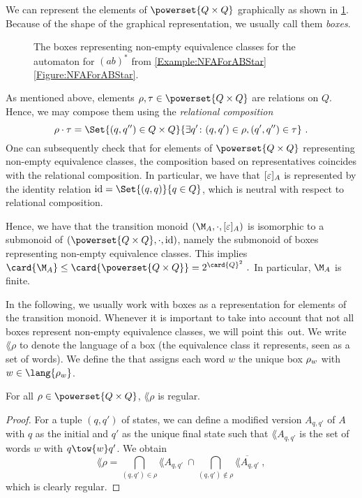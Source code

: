 \documentclass[../../diss.tex]{subfiles}
\begin{document}
We can represent the elements of $\powerset{Q \times Q}$ graphically as shown in \cref{Figure:BoxesForABStar}.
Because of the shape of the graphical representation, we usually call them \emph{boxes}.

\begin{figure}
    \centering
    
    \caption{The boxes representing non-empty equivalence classes for the automaton for ${(ab)}^*$ from \cref{Example:NFAForABStar} \resp \cref{Figure:NFAForABStar}.}%
    \label{Figure:BoxesForABStar}%
\end{figure}


As mentioned above, elements $\rho, \tau \in \powerset{Q \times Q}$ are relations on $Q$.
Hence, we may compose them using the \emph{relational composition}
\[
    \rho \relcomp \tau = \Set{ (q,q'') \in Q \times Q}{ \exists q' \colon (q,q') \in \rho, (q',q'') \in \tau}
    \ .
\]
One can subsequently check that for elements of $\powerset{Q \times Q}$ representing non-empty equivalence classes, the composition based on representatives coincides with the relational composition.
In particular, we have that $[\varepsilon]_{A}$ is represented by the identity relation $\id = \Set{ (q,q) }{ q \in Q}$, which is neutral with respect to relational composition.

Hence, we have that the transition monoid $(\nfatransmonoid{A},\relcomp,\nfaequivclass{A}{\varepsilon})$ is isomorphic to a submonoid of $(\powerset{Q \times Q}, \relcomp, \id)$, namely the submonoid of boxes representing non-empty equivalence classes.
This implies
\(
    \card{\nfatransmonoid{A}} \leq \card{\powerset{Q \times Q}} = 2^{\card{Q}^2}
    \ .
\)
In particular, $\nfatransmonoid{A}$ is finite.


In the following, we usually work with boxes as a representation for elements of the transition monoid.
Whenever it is important to take into account that not all boxes represent non-empty equivalence classes, we will point this~out.
We write $\lang{\rho}$ to denote the language of a box (\ie the equivalence class it represents, seen as a set of words).
We define the  that assigns each word $w$ the unique box $\tbox{w}$ with $w \in \lang{\tbox{w}}$.

\begin{lemma}
    For all $\rho \in \powerset{Q \times Q}$, $\lang{\rho}$ is regular.
\end{lemma}

\begin{proof}
    For a tuple $(q,q')$ of states, we can define a modified version $A_{q,q'}$ of $A$ with $q$ as the initial and $q'$ as the unique final state such that $\lang{A_{q,q'}}$ is the set of words $w$ with $q \tow{w} q'$.
    We obtain
    \[
        \lang{\rho} = \bigcap_{ (q,q') \in \rho} \lang{A_{q,q'}} \ \cap \bigcap_{ (q,q') \not\in \rho} \overline{\lang{A_{q,q'}}}\ ,
    \]
    which is clearly regular.
\end{proof}
\end{document}
